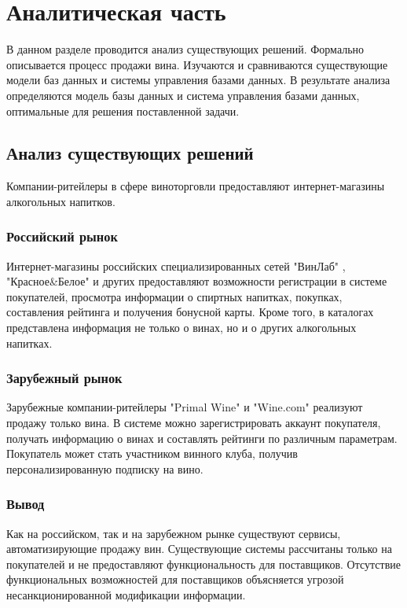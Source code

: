 \chapter{Аналитическая часть}

В данном разделе проводится анализ существующих решений. Формально описывается процесс продажи вина. Изучаются и сравниваются существующие модели баз данных и системы управления базами данных. В результате анализа определяются модель базы данных и система управления базами данных, оптимальные для решения поставленной задачи.

\section{Анализ существующих решений}

Компании-ритейлеры в сфере виноторговли предоставляют интернет-магазины алкогольных напитков.

\subsection{Российский рынок}

Интернет-магазины российских специализированных сетей "ВинЛаб" \cite{winelab}, "Красное\&Белое" \cite{kb} и других предоставляют возможности 
регистрации в системе покупателей, просмотра информации о спиртных напитках, покупках, составления рейтинга и получения бонусной карты. Кроме того, в каталогах представлена информация не только о винах, но и о других алкогольных напитках.

\subsection{Зарубежный рынок}

Зарубежные компании-ритейлеры "Primal Wine" \cite{primal_wine} и "Wine.com" \cite{wine_com} реализуют продажу только вина. В системе можно зарегистрировать аккаунт покупателя, получать информацию о винах и составлять рейтинги по различным параметрам. Покупатель может стать участником винного клуба, получив персонализированную подписку на вино. 

\subsection{Вывод}

Как на российском, так и на зарубежном рынке существуют сервисы, автоматизирующие продажу вин. Существующие системы рассчитаны только на покупателей и не предоставляют функциональность для поставщиков. Отсутствие функциональных возможностей для поставщиков объясняется угрозой несанкционированной модификации информации.

